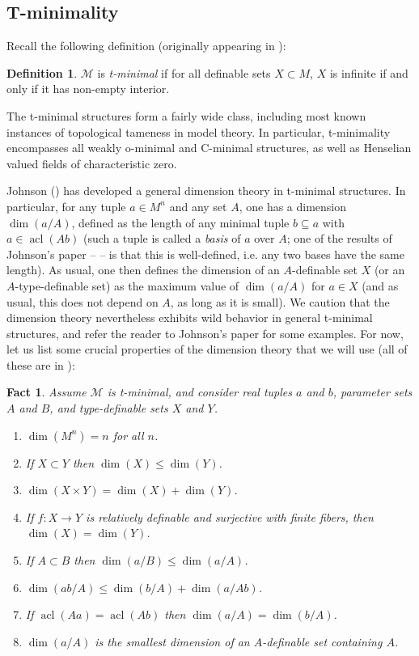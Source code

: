 \documentclass{amsart}
\newtheorem{fact}[theorem]{Fact}
\theoremstyle{definition}
\newtheorem{definition}[theorem]{Definition}
\newcommand{\acl}{\operatorname{acl}}
\begin{document}
\subsection{T-minimality}

Recall the following definition (originally appearing in \cite{Matth}):

\begin{definition}\label{D: tmin}
    $\mathcal M$ is \textit{t-minimal} if for all definable sets $X\subset M$, $X$ is infinite if and only if it has non-empty interior. 
\end{definition}

The t-minimal structures form a fairly wide class, including most known instances of topological tameness in model theory. In particular, t-minimality encompasses all weakly o-minimal and C-minimal structures, as well as Henselian valued fields of characteristic zero.

Johnson (\cite[Definition 2.26, 2.29]{t-minimal-johnson}) has developed a general dimension theory in t-minimal structures. In particular, for any tuple $a\in M^n$ and any set $A$, one has a dimension $\dim(a/A)$, defined as the length of any minimal tuple $b\subseteq a$ with $a\in\acl(Ab)$ (such a tuple is called a \textit{basis} of $a$ over $A$; one of the results of Johnson's paper -- \cite[Proposition 2.25]{t-minimal-johnson} -- is that this is well-defined, i.e. any two bases have the same length). As usual, one then defines the dimension of an $A$-definable set $X$ (or an $A$-type-definable set) as the maximum value of $\dim(a/A)$ for $a\in X$ (and as usual, this does not depend on $A$, as long as it is small). We caution that the dimension theory nevertheless exhibits wild behavior in general t-minimal structures, and refer the reader to Johnson's paper for some examples. For now, let us list some crucial properties of the dimension theory that we will use (all of these are in \cite[Proposition 2.31 and Theorem 2.37]{t-minimal-johnson}):

\begin{fact}\label{F: tmin} Assume $\mathcal M$ is t-minimal, and consider real tuples $a$ and $b$, parameter sets $A$ and $B$, and type-definable sets $X$ and $Y$.
\begin{enumerate}
    \item $\dim(M^n)=n$ for all $n$.
    \item If $X\subset Y$ then $\dim(X)\leq\dim(Y)$.
    \item $\dim(X\times Y)=\dim(X)+\dim(Y)$.
    \item If $f:X\rightarrow Y$ is relatively definable and surjective with finite fibers, then $\dim(X)=\dim(Y)$.
    \item If $A\subset B$ then $\dim(a/B)\leq\dim(a/A)$.
    \item\label{subad} $\dim(ab/A)\leq\dim(b/A)+\dim(a/Ab)$.
    \item If $\acl(Aa)=\acl(Ab)$ then $\dim(a/A)=\dim(b/A)$.
    \item $\dim(a/A)$ is the smallest dimension of an $A$-definable set containing $A$.
\end{enumerate}
\end{fact}
\end{document}
